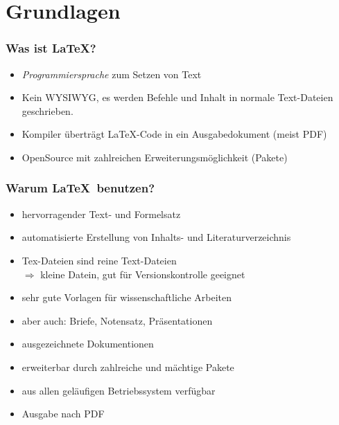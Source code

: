 \section{Grundlagen}
\begin{frame}
    \frametitle{Was ist \LaTeX?}
    \begin{itemize}
        \item \emph{Programmiersprache} zum Setzen von Text
        \item Kein WYSIWYG, es werden Befehle und Inhalt in normale Text-Dateien geschrieben.
        \item Kompiler überträgt \LaTeX-Code in ein Ausgabedokument (meist PDF)
        \item OpenSource mit zahlreichen Erweiterungsmöglichkeit (Pakete)
    \end{itemize}
\end{frame}
\begin{frame}
    \frametitle{Warum \LaTeX \ benutzen?}
    \begin{itemize}
        \item hervorragender Text- und Formelsatz
        \item automatisierte Erstellung von Inhalts- und Literaturverzeichnis
        \item Tex-Dateien sind reine Text-Dateien \\
              $\Rightarrow$ kleine Datein, gut für Versionskontrolle geeignet
        \item sehr gute Vorlagen für wissenschaftliche Arbeiten 
        \item aber auch: Briefe, Notensatz, Präsentationen 
        \item ausgezeichnete Dokumentionen
        \item erweiterbar durch zahlreiche und mächtige Pakete
        \item aus allen geläufigen Betriebssystem verfügbar
        \item Ausgabe nach PDF
    \end{itemize}
\end{frame}

